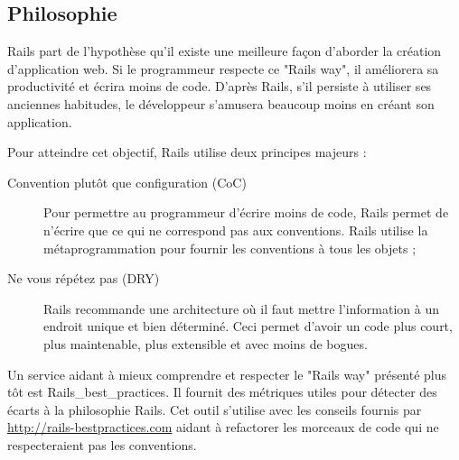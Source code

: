 \subsection{Philosophie}
Rails part de l'hypothèse qu'il existe une meilleure façon d'aborder la création d'application web. Si le programmeur respecte ce "Rails way", il améliorera sa productivité et écrira moins de code. D'après Rails, s’il persiste à utiliser ses anciennes habitudes, le développeur s'amusera beaucoup moins en créant son application.

Pour atteindre cet objectif, Rails utilise deux principes majeurs :
\begin{description}
  \item[Convention plutôt que configuration (CoC)] Pour permettre au programmeur d'écrire moins de code, Rails permet de n'écrire que ce qui ne correspond pas aux conventions. Rails utilise la métaprogrammation pour fournir les conventions à tous les objets ;
  \item[Ne vous répétez  pas (DRY)] Rails recommande une architecture où il faut mettre l'information à un endroit unique et bien déterminé. Ceci permet d'avoir un code plus court, plus maintenable, plus extensible et avec moins de bogues.
\end{description}

Un service aidant à mieux comprendre et respecter le "Rails way" présenté plus tôt est Rails\_best\_practices. Il fournit des métriques utiles pour détecter des écarts à la philosophie Rails. Cet outil s'utilise avec les conseils fournis par \url{http://rails-bestpractices.com} aidant à refactorer les morceaux de code qui ne respecteraient pas les conventions.

